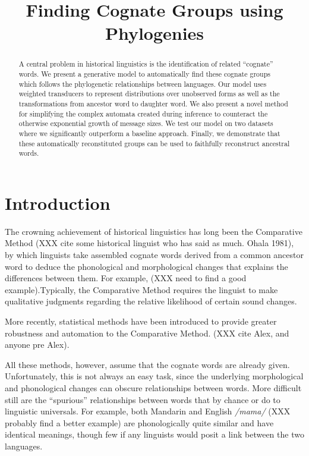 \documentclass[11pt,a4paper]{article}
\title{Finding Cognate Groups using Phylogenies}
\author{}
\date{}
\begin{document}
\maketitle
\begin{abstract}
  A central problem in historical linguistics is the identification
  of related ``cognate'' words. We present a generative model to
  automatically find these cognate groups which follows the
  phylogenetic relationships between languages. Our model uses
  weighted transducers to represent distributions over unobserved
  forms as well as the transformations from ancestor word to daughter
  word. We also present a novel method for simplifying the complex
  automata created during inference to counteract the otherwise
  exponential growth of message sizes. We test our model on two
  datasets where we significantly outperform a baseline approach.
  Finally, we demonstrate that these automatically reconstituted
  groups can be used to faithfully reconstruct ancestral words.
\end{abstract}
\section{Introduction}

The crowning achievement of historical linguistics has long been
the Comparative Method (XXX cite some historical linguist who has said as much. Ohala 1981), by which
linguists take assembled cognate words derived from a common ancestor
word to deduce the phonological and morphological changes that
explains the differences between them. For example, (XXX need to
find a good example).Typically, the Comparative Method requires
the linguist to make qualitative judgments regarding the relative
likelihood of certain sound changes.

More recently, statistical methods have been introduced to provide
greater robustness and automation to the Comparative Method. (XXX cite
Alex, and anyone pre Alex). 

All these methods, however, assume that the cognate words are already
given. Unfortunately, this is not always an easy task, since the
underlying morphological and phonological changes can obscure
relationships between words.  More difficult still are the ``spurious''
relationships between words that by chance or do to linguistic
universals. For example, both Mandarin and English \textit{/mama/}
(XXX probably find a better example) are phonologically quite similar
and have identical meanings, though few if any linguists would posit
a link between the two languages.
\end{document}

